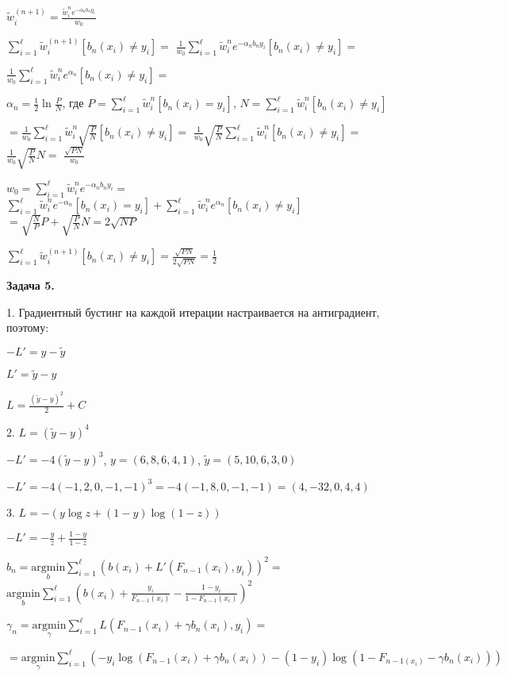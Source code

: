 \documentclass{article}
\begin{document}
    $\tilde w_i^{(n+1)}=\frac{\tilde w_i^{n}e^{-\alpha_{n}b_{n}y_{i}}}{w_0}$

    $\sum_{i=1}^{\ell}\tilde w_i^{(n+1)}[b_n(x_i) \neq y_i]=$
    $\frac{1}{w_0}\sum_{i=1}^{\ell}\tilde w_i^{n}e^{-\alpha_{n}b_{n}y_{i}}[b_n(x_i)\neq y_i]=$

    $\frac{1}{w_0}\sum_{i=1}^{\ell}\tilde w_i^{n}e^{\alpha_n}[b_n(x_i)\neq y_i]=$

    $\alpha_n=\frac{1}{2}\ln{\frac{P}{N}}$, где
    $P=\sum_{i=1}^{\ell}\tilde w_i^{n}[b_n(x_i)=y_i]$,
    $N=\sum_{i=1}^{\ell}\tilde w_i^{n}[b_n(x_i)\neq y_i]$

    $=\frac{1}{w_0}\sum_{i=1}^{\ell}\tilde w_i^{n}\sqrt{\frac{P}{N}}[b_n(x_i)\neq y_i]=$
    $\frac{1}{w_0}\sqrt{\frac{P}{N}}\sum_{i=1}^{\ell}\tilde w_i^{n}[b_n(x_i)\neq y_i]=$
    $\frac{1}{w_0}\sqrt{\frac{P}{N}}N=$
    $\frac{\sqrt{PN}}{w_0}$

    $w_{0}=\sum_{i=1}^{\ell}\tilde w_i^{n}e^{-\alpha_{n}b_{n}y_{i}}=$
    $\sum_{i=1}^{\ell}\tilde w_i^{n}e^{-\alpha_{n}}[b_n(x_i)=y_i]+\sum_{i=1}^{\ell}\tilde w_i^{n}e^{\alpha_n}[b_n(x_i)\neq y_i]$
    $=\sqrt{\frac{N}{P}}P+\sqrt{\frac{P}{N}}N=2\sqrt{NP}$

    $\sum_{i=1}^{\ell}\tilde w_i^{(n+1)}[b_n(x_i) \neq y_i]=\frac{\sqrt{PN}}{2\sqrt{PN}}=\frac{1}{2}$

    \textbf {Задача 5.}

    1. Градиентный бустинг на каждой итерации настраивается на антиградиент, поэтому:

    $-L'=y-\tilde y$

    $L'=\tilde y-y$

    $L=\frac{(\tilde y-y)^2}{2}+C$

    2. $L=(\tilde y-y)^4$

    $-L'=-4(\tilde y-y)^3$, $y=(6,8,6,4,1)$, $\tilde y=(5,10,6,3,0)$

    $-L'=-4(-1,2,0,-1,-1)^{3}=-4(-1,8,0,-1,-1)=(4,-32,0,4,4)$

    3. $L=-(y\log{z}+(1-y)\log(1-z))$

    $-L'=-\frac{y}{z}+\frac{1-y}{1-z}$

    $b_{n}=\underset{b}{\mathrm{argmin}}\sum_{i=1}^{\ell}(b(x_i)+L'(F_{n-1}(x_i), y_i))^{2}=$
    $\underset{b}{\mathrm{argmin}}\sum_{i=1}^{\ell}(b(x_i)+\frac{y_i}{F_{n-1}(x_i)}-\frac{1-y_i}{1-F_{n-1}(x_i)})^2$

    $\gamma_{n}=\underset{\gamma}{\mathrm{argmin}}\sum_{i=1}^{\ell}L(F_{n-1}(x_i)+\gamma b_n(x_i), y_i)=$

    $=\underset{\gamma}{\mathrm{argmin}}\sum_{i=1}^{\ell}(-y_i\log(F_{n-1}(x_i)+\gamma b_n(x_i))-(1-y_i)\log(1-F_{n-1(x_i)}-\gamma b_n(x_i)))$
\end{document}

